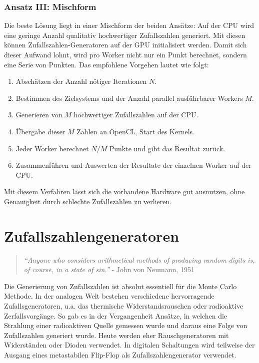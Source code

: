 \documentclass{book}
\begin{document}
\begin{refsection}
\subsubsection{Ansatz III: Mischform}
Die beste Lösung liegt in einer Mischform der beiden Ansätze: Auf der CPU wird eine geringe Anzahl qualitativ hochwertiger Zufallszahlen generiert. Mit diesen können Zufallszahlen-Generatoren auf der GPU initialisiert werden. Damit sich dieser Aufwand lohnt, wird pro Worker nicht nur ein Punkt berechnet, sondern eine Serie von Punkten. Das empfohlene Vorgehen lautet wie folgt:
\begin{enumerate}
	\item Abschätzen der Anzahl nötiger Iterationen $N$.
	\item Bestimmen des Zielsystems und der Anzahl parallel ausführbarer Workers $M$.
	\item Generieren von $M$ hochwertiger Zufallszahlen auf der CPU.
	\item Übergabe dieser $M$ Zahlen an OpenCL, Start des Kernels.
	\item Jeder Worker berechnet $N/M$ Punkte und gibt das Resultat zurück.
	\item Zusammenführen und Auswerten der Resultate der einzelnen Worker auf der CPU.
\end{enumerate}

Mit diesem Verfahren lässt sich die vorhandene Hardware gut ausnutzen, ohne Genauigkeit durch schlechte Zufallszahlen zu verlieren. 

\clearpage
\section{Zufallszahlengeneratoren} 

\begin{quote}
\textit{“Anyone who considers arithmetical methods of producing random digits is, of course, in a state of sin.”} - John von Neumann, 1951
\end{quote}

Die Generierung von Zufallszahlen ist absolut essentiell für die Monte Carlo Methode. In der analogen Welt bestehen verschiedene hervorragende Zufallsgeneratoren, u.a. das thermische Widerstandsrauschen oder radioaktive Zerfallsvorgänge. So gab es in der Vergangenheit Ansätze, in welchen die Strahlung einer radioaktiven Quelle gemessen wurde und daraus eine Folge von Zufallszahlen generiert wurde. Heute werden eher Rauschgeneratoren mit Widerständen oder Dioden verwendet. In digitalen Schaltungen wird teilweise der Ausgang eines metastabilen Flip-Flop als Zufallszahlengenerator verwendet.\\


\end{refsection}
\end{document}
